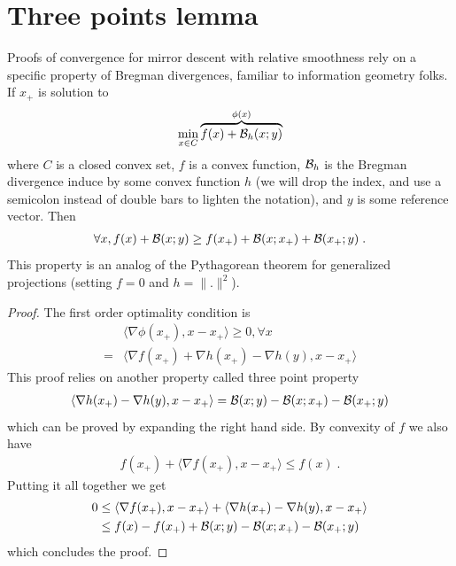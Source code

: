 \documentclass{article}
\begin{document}
\section{Three points lemma}
\label{app:3points}

Proofs of convergence for mirror descent with relative smoothness rely on a specific property of Bregman divergences, familiar to information geometry folks. If $x_+$ is solution to 
\begin{align}
	\min	_{x\in C} \overbrace{f(x) + {\mathcal B}_h(x ; y)}^{\phi(x)}
\end{align}
where $C$ is a closed convex set, $f$ is a convex function, ${\mathcal B}_h$ is the Bregman divergence induce by some convex function $h$ (we will drop the index, and use a semicolon instead of double bars to lighten the notation), and $y$ is some reference vector. Then 
\begin{align}
	\forall x, f(x) + {\mathcal B}(x ;y) \geq f(x_+) + {\mathcal B}(x ; x_+) +{\mathcal B}(x_+ ; y) \; .
\end{align}
This property is an analog of the Pythagorean theorem for generalized projections (setting $f=0$ and $h=\|.\|^2$).

\begin{proof}
	The first order optimality condition is
	\begin{align}
		&\langle \nabla \phi (x_+) , x -  x_+ \rangle \geq 0, \forall x \\
		=& \langle \nabla f(x_+) + \nabla h(x_+) - \nabla h (y), x - x_+ \rangle  
	\end{align}
	This proof relies on another property called three point property 
	\begin{align}
		\langle \nabla h(x_+) - \nabla h (y), x - x_+ \rangle  ={\mathcal B}(x;y) -{\mathcal B}(x;x_+) - {\mathcal B}(x_+;y) 
	\end{align}
	which can be proved by expanding the right hand side.
	By convexity of $f$ we also have 
	\begin{align}
		 f(x_+) + \langle \nabla f(x_+), x - x_+ \rangle \leq f(x) \; .
	\end{align} 
	Putting it all together we get
	\begin{align}
		0 
		&\leq  \langle \nabla f(x_+), x - x_+ \rangle + \langle \nabla h(x_+) - \nabla h (y), x - x_+ \rangle  \\
		&\leq f(x) - f(x_+) + {\mathcal B}(x;y) -{\mathcal B}(x;x_+) - {\mathcal B}(x_+;y)
	\end{align}
	which concludes the proof.
\end{proof}
\end{document}
